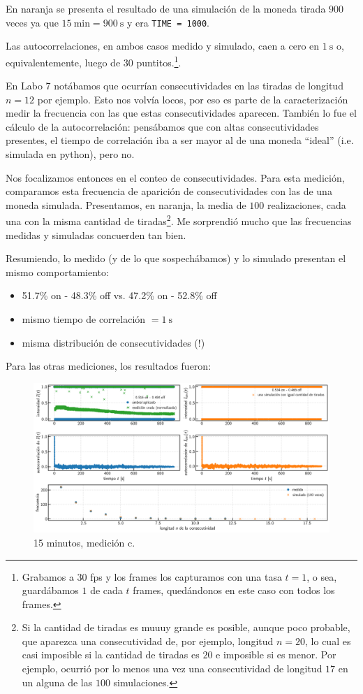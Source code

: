 \documentclass[a4paper]{article}
\begin{document}
En naranja se presenta el resultado de una simulación de la moneda tirada $900$ veces ya que $\SI{15}{\minute} = \SI{900}{\second}$ y era \texttt{TIME = 1000}.

Las autocorrelaciones, en ambos casos medido y simulado, caen a cero en $\SI{1}{\second}$ o, equivalentemente, luego de $30$ puntitos.\footnote{Grabamos a $30$ fps y los frames los capturamos con una tasa $t = 1$, o sea, guardábamos $1$ de cada $t$ frames, quedándonos en este caso con todos los frames.}.

En Labo 7 notábamos que ocurrían consecutividades en las tiradas de longitud $n=12$ por ejemplo. Esto nos volvía locos, por eso es parte de la caracterización medir la frecuencia con las que estas consecutividades aparecen. También lo fue el cálculo de la autocorrelación: pensábamos que con altas consecutividades presentes, el tiempo de correlación iba a ser mayor al de una moneda ``ideal'' (i.e. simulada en python), pero no.



Nos focalizamos entonces en el conteo de consecutividades. Para esta medición, comparamos esta frecuencia de aparición de consecutividades con las de una moneda simulada. Presentamos, en naranja, la media de $100$ realizaciones, cada una con la misma cantidad de tiradas\footnote{Si la cantidad de tiradas es muuuy grande es posible, aunque poco probable, que aparezca una consecutividad de, por ejemplo, longitud $n=20$, lo cual es casi imposible si la cantidad de tiradas es $20$ e imposible si es menor. Por ejemplo, ocurrió por lo menos una vez una consecutividad de longitud $17$ en un alguna de las $100$ simulaciones.}. Me sorprendió mucho que las frecuencias medidas y simuladas concuerden tan bien. 

Resumiendo, lo medido (y de lo que sospechábamos) y lo simulado presentan el mismo comportamiento:
\begin{itemize}
	\item 51.7\% on - 48.3\% off vs. 47.2\% on - 52.8\% off
	\item mismo tiempo de correlación $= \SI{1}{\second}$
	\item misma distribución de consecutividades (!)
\end{itemize}

Para las otras mediciones, los resultados fueron:


\begin{figure}[!h]
	\centering
	\includegraphics[width=\linewidth]{Resultados/15min_c.png}
	\caption{15 minutos, medición c.}
\end{figure}
\end{document}
